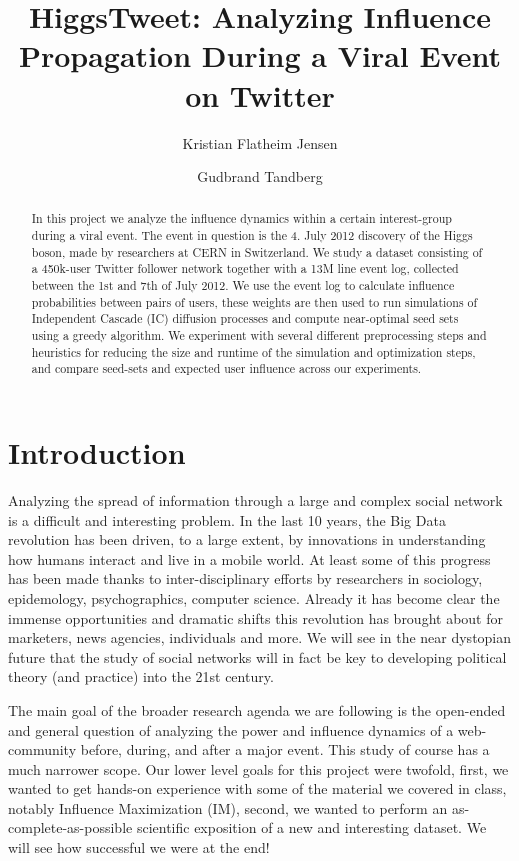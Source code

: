 \documentclass[sigconf]{acmart}
\title{HiggsTweet: Analyzing Influence Propagation During a Viral Event on Twitter}
\author{Kristian Flatheim Jensen}
\affiliation{%
\institution{Norwegian University of Science and Technology}
}
\author{Gudbrand Tandberg}
\affiliation{%
\institution{The University of British Colombia}
}
\begin{document}
\maketitle

\begin{abstract}
In this project we analyze the influence dynamics within a certain interest-group during a viral event. The event in question is the 4. July 2012 discovery of the Higgs boson, made by researchers at CERN in Switzerland. We study a dataset consisting of a 450k-user Twitter follower network together with a 13M line event log, collected between the 1st and 7th of July 2012. We use the event log to calculate influence probabilities between pairs of users, these weights are then used to run simulations of Independent Cascade (IC) diffusion processes and compute near-optimal seed sets using a greedy algorithm. We experiment with several different preprocessing steps and heuristics for reducing the size and runtime of the simulation and optimization steps, and compare seed-sets and expected user influence across our experiments. 
\end{abstract}

\section{Introduction}

Analyzing the spread of information through a large and complex social network is a difficult and interesting problem. In the last 10 years, the Big Data revolution has been driven, to a large extent, by innovations in understanding how humans interact and live in a mobile world. At least some of this progress has been made thanks to inter-disciplinary efforts by researchers in sociology, epidemology, psychographics, computer science. Already it has become clear the immense opportunities and dramatic shifts this revolution has brought about for marketers, news agencies, individuals and more. We will see in the near dystopian future that the study of social networks will in fact be key to developing political theory (and practice) into the 21st century.

The main goal of the broader research agenda we are following is the open-ended and general question of analyzing the power and influence dynamics of a web-community before, during, and after a major event. This study of course has a much narrower scope. Our lower level goals for this project were twofold, first, we wanted to get hands-on experience with some of the material we covered in class, notably Influence Maximization (IM), second, we wanted to perform an as-complete-as-possible scientific exposition of a new and interesting dataset. We will see how successful we were at the end!
\end{document}
